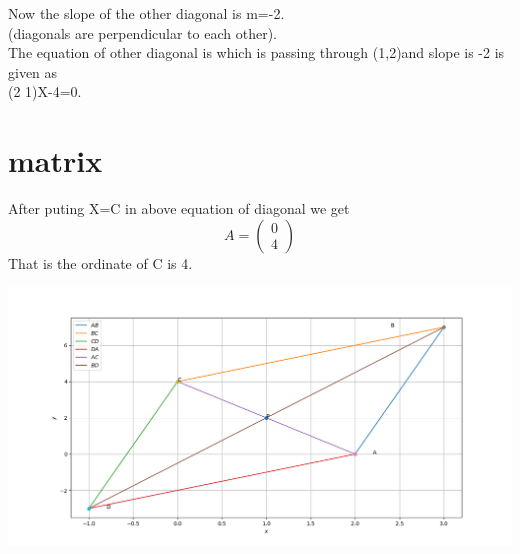 \documentclass{beamer}
\begin{document}
\begin{frame}
Now the slope of the other diagonal is m=-2.\\
(diagonals are perpendicular to each other).\\
The equation of other diagonal is which is passing through (1,2)and slope is -2 is given as \\
 (2 1)X-4=0.\\
\section{matrix}
After puting X=C in above equation of diagonal we get
\[
A= \begin{pmatrix}
0\\
4
\end{pmatrix}
\]
That is the ordinate of C is 4.


\end{frame}


\begin{frame}
\includegraphics[scale=0.3]{Figure_1.png} 

\end{frame}
\end{document}

